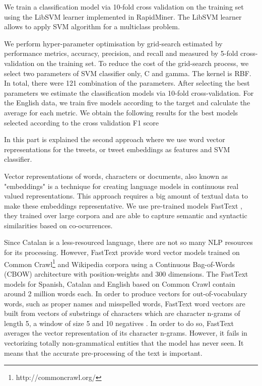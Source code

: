 \documentclass[10pt, a4paper]{article}
\begin{document}
We train a classification model via 10-fold cross validation on the training set using the LibSVM learner \cite{Fan2005} implemented in RapidMiner. The LibSVM learner allows to apply SVM algorithm for a multiclass problem.

We perform hyper-parameter optimisation by grid-search  estimated by performance metrics, accuracy, precision, and recall and measured by 5-fold cross-validation on the training set. To reduce the cost of the grid-search process, we select two parameters of SVM classifier only, C and gamma.  The kernel is RBF.  In total, there were 121 combination of the parameters. After  selecting  the  best  parameters  we  estimate  the  classification  models  via  10-fold
cross-validation.  For the English data, we train five models according to the target and calculate the average for each metric.  We obtain the following results for the best models selected according to the cross validation F1 score

In this part is explained the second approach where we use word vector representations for the tweets, or tweet embeddings as features and SVM classifier.

Vector representations of words, characters or documents, also known as "embeddings" is a technique for creating language models in continuous real valued representations. This approach requires a big amount of textual data to make these embeddings representative. We use pre-trained models FastText \cite{joulin-etal-2017-bag}, they trained over large corpora and are able to capture semantic and syntactic similarities based on co-ocurrences.

Since Catalan is a less-resourced language, there are not so many NLP resources for its processing. However, FastText provide word vector models trained on Common Crawl\footnote{http://commoncrawl.org/} and Wikipedia corpora using a Continuous Bag-of-Words (CBOW) architecture with position-weights and 300 dimensions. The FastText models for Spanish, Catalan and English based on Common Crawl contain around 2 million words each. In order to produce vectors for out-of-vocabulary words, such as proper names and misspelled words, FastText word vectors are built from vectors of substrings of characters which are character n-grams of length 5, a window of size 5 and 10 negatives \cite{Grave18}. In order to do so, FastText averages the vector representation of its character n-grams. However, it fails in vectorizing totally non-grammatical entities that the model has never seen. It means that the accurate pre-processing of the text is important.
\end{document}
